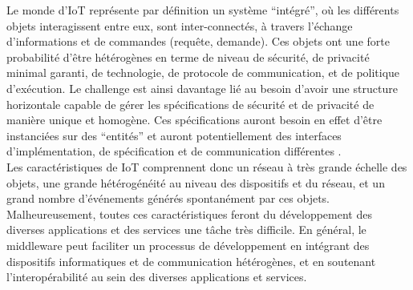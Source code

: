 Le monde d’IoT représente par définition un système “intégré”, où les différents objets interagissent entre eux, sont inter-connectés, à travers l’échange d’informations et de commandes (requête, demande). Ces objets ont une forte probabilité d’être hétérogènes en terme de niveau de sécurité, de privacité minimal garanti, de technologie, de protocole de communication, et de politique d’exécution. Le challenge est ainsi davantage lié au besoin d’avoir une structure horizontale capable de gérer les spécifications de sécurité et de privacité de manière unique et homogène. Ces spécifications auront besoin en effet d’être instanciées sur des “entités” et auront potentiellement des interfaces d’implémentation, de spécification et de communication différentes \cite{vermesan2014internet}.
\\

Les caractéristiques de IoT comprennent donc un réseau à très grande échelle des objets, une grande hétérogénéité au niveau des dispositifs et du réseau, et un grand nombre d'événements générés spontanément par ces objets. Malheureusement, toutes ces caractéristiques feront du développement des diverses applications et des services une tâche très difficile. En général, le middleware peut faciliter un processus de développement en intégrant des dispositifs informatiques et de communication hétérogènes, et en soutenant l'interopérabilité au sein des diverses applications et services.

